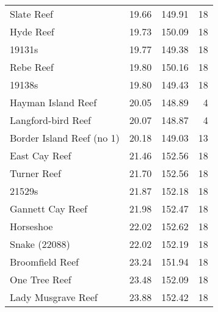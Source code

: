 \begin{table}[ht]
\begin{center}
{\begin{tabular}{lrrr}
  Slate Reef & 19.66 & 149.91 & 18 \\
  Hyde Reef & 19.73 & 150.09 & 18 \\
  19131s & 19.77 & 149.38 & 18 \\
  Rebe Reef & 19.80 & 150.16 & 18 \\
  19138s & 19.80 & 149.43 & 18 \\
  Hayman Island Reef & 20.05 & 148.89 & 4 \\
  Langford-bird Reef & 20.07 & 148.87 & 4 \\
  Border Island Reef (no 1) & 20.18 & 149.03 & 13 \\
  East Cay Reef & 21.46 & 152.56 & 18 \\
  Turner Reef & 21.70 & 152.56 & 18 \\
  21529s & 21.87 & 152.18 & 18 \\
  Gannett Cay Reef & 21.98 & 152.47 & 18 \\
  Horseshoe & 22.02 & 152.62 & 18 \\
  Snake (22088) & 22.02 & 152.19 & 18 \\
  Broomfield Reef & 23.24 & 151.94 & 18 \\
  One Tree Reef & 23.48 & 152.09 & 18 \\
  Lady Musgrave Reef & 23.88 & 152.42 & 18 \\
   \bottomrule
\end{tabular}
}
\end{center}
\end{table}
